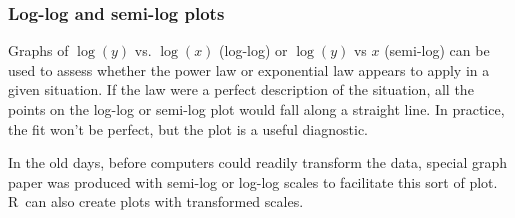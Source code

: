 \documentclass[twoside]{book}\usepackage[]{graphicx}\usepackage[]{xcolor}
\def\R{{\sf R}}
\begin{document}
\subsubsection{Log-log and semi-log plots}

Graphs of $\log(y)$ vs. $\log(x)$ (log-log) or $\log(y)$ vs $x$ (semi-log)
can be used to assess whether the power law or exponential law appears to apply
in a given situation.  If the law were a perfect description of the situation,
all the points on the log-log or semi-log plot would fall along a straight line.
In practice, the fit won't be perfect, but the plot is a useful diagnostic.

In the old days, before computers could readily transform the data, special
graph paper was produced with semi-log or log-log scales to facilitate this
sort of plot.  \R\ can also create plots with transformed scales.
\end{document}

